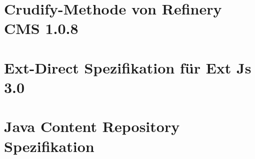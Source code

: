 \newpage


\section{Crudify-Methode von Refinery CMS 1.0.8}




\section{Ext-Direct Spezifikation für Ext Js 3.0}



\section{Java Content Repository Spezifikation}
%

